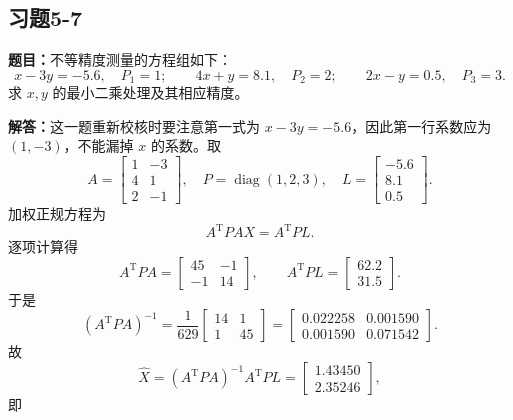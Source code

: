 \documentclass[UTF8,zihao=-4]{ctexart}
\newcommand{\problem}[1]{\subsection*{#1}}
\newcommand{\timu}{\noindent\textbf{题目：}}
\newcommand{\jieda}{\noindent\textbf{解答：}}
\begin{document}
{\newpage

\problem{习题5-7}
\timu 不等精度测量的方程组如下：
\begin{equation*}
    x-3y=-5.6,\quad P_1=1;\qquad
    4x+y=8.1,\quad P_2=2;\qquad
    2x-y=0.5,\quad P_3=3.
\end{equation*}
求 $x,y$ 的最小二乘处理及其相应精度。

\jieda 这一题重新校核时要注意第一式为 $x-3y=-5.6$，因此第一行系数应为 $(1,-3)$，不能漏掉 $x$ 的系数。取
\begin{equation*}
    A=\begin{bmatrix}1&-3\\4&1\\2&-1\end{bmatrix},\quad
    P=\operatorname{diag}(1,2,3),\quad
    L=\begin{bmatrix}-5.6\\8.1\\0.5\end{bmatrix}.
\end{equation*}
加权正规方程为
\begin{equation*}
    A^{\mathrm T}PAX=A^{\mathrm T}PL.
\end{equation*}
逐项计算得
\begin{equation*}
    A^{\mathrm T}PA=\begin{bmatrix}45&-1\\-1&14\end{bmatrix},
    \qquad
    A^{\mathrm T}PL=\begin{bmatrix}62.2\\31.5\end{bmatrix}.
\end{equation*}
于是
\begin{equation*}
    (A^{\mathrm T}PA)^{-1}
    =\frac{1}{629}\begin{bmatrix}14&1\\1&45\end{bmatrix}
    =\begin{bmatrix}0.022258&0.001590\\0.001590&0.071542\end{bmatrix}.
\end{equation*}
故
\begin{equation*}
    \hat X=(A^{\mathrm T}PA)^{-1}A^{\mathrm T}PL
    =\begin{bmatrix}1.43450\\2.35246\end{bmatrix},
\end{equation*}
即
\begin{equation*}

\end{equation*}}
\end{document}

